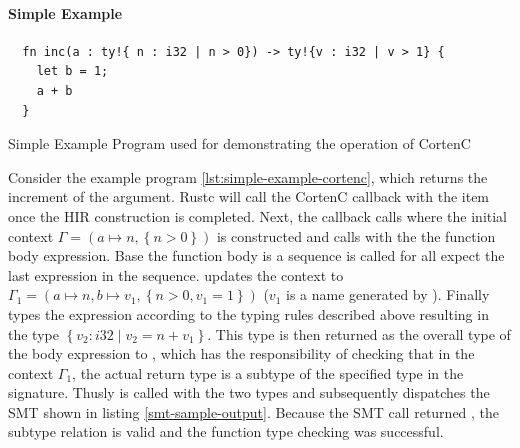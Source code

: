 \documentclass[twoside, english]{sdqthesis}
\theoremstyle{definition}
\begin{document}
\paragraph{Simple Example}

\begin{listing}[ht]
  \begin{verbatim}
  fn inc(a : ty!{ n : i32 | n > 0}) -> ty!{v : i32 | v > 1} {
    let b = 1;
    a + b
  }
  \end{verbatim}
  \caption{Simple Example Program used for demonstrating the operation of CortenC}
  \label{lst:simple-example-cortenc}
\end{listing}

Consider the example program \ref{lst:simple-example-cortenc}, which returns the increment of the argument.
Rustc will call the CortenC callback with the item  once the HIR construction is completed. Next, the callback calls  where the initial context $\Gamma = ( a \mapsto n, \left\{ n > 0\right\})$ is constructed and calls  with the the function body expression. Base the function body is a sequence  is called for all expect the last expression in the sequence.  updates the context to $\Gamma_1 = ( a \mapsto n, b \mapsto v_1, \left\{ n > 0, v_1 = 1\right\})$ ($v_1$ is a name generated by ). 
Finally  types the expression  according to the typing rules described above resulting in the type $\left\{ v_2 : i32 \mid v_2 = n + v_1\right\}$.
This type is then returned as the overall type of the body expression to , which has the responsibility of checking that in the context $\Gamma_1$, the actual return type is a subtype of the specified type in the signature. 
Thusly  is called with the two types and subsequently dispatches the SMT shown in listing \ref{smt-sample-output}. 
Because the SMT call returned , the subtype relation is valid and the function type checking was successful.
\end{document}
